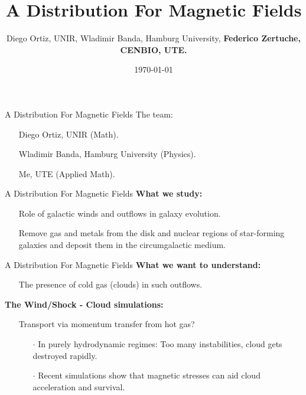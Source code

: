 \documentclass{beamer}
\title{A Distribution For Magnetic Fields}
\author{Diego Ortiz, UNIR, Wladimir Banda, Hamburg University, \textbf{Federico Zertuche, CENBIO, UTE.}}
\date{\today}
\begin{document}
\begin{frame}
\titlepage
\end{frame}

\begin{frame}{A Distribution For Magnetic Fields}
The team:
\begin{itemize}
  \item[] Diego Ortiz, UNIR (Math).
  \item[] Wladimir Banda, Hamburg University (Physics).
  \item[] Me, UTE (Applied Math).
\end{itemize}
\end{frame}


\begin{frame}{A Distribution For Magnetic Fields}
 \textbf{What we study:}
 \begin{itemize}
  \setlength\itemsep{1em}
  \item[] Role of galactic winds and outflows in galaxy evolution.
  \item[] Remove gas and metals from the disk and nuclear regions of star-forming galaxies and deposit them in the circumgalactic medium.
\end{itemize}
\begin{center}
\end{center}
\end{frame}


\begin{frame}{A Distribution For Magnetic Fields}
  \textbf{What we want to understand:}
\begin{itemize}
  \setlength\itemsep{1em}
  \item[] The presence of cold gas (clouds) in such outflows.
\end{itemize}


\textbf{The Wind/Shock - Cloud simulations:}
\begin{itemize}
  \item[] Transport via momentum transfer from hot gas?
  \begin{itemize}
    \item[$\cdot$] In purely hydrodynamic regimes: Too many instabilities, cloud gets destroyed rapidly.
    \item[$\cdot$] Recent simulations show that magnetic stresses can aid cloud acceleration and survival.
  \end{itemize}
\end{itemize}
\end{frame}
\end{document}
